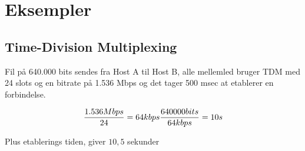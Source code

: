 \documentclass[10pt]{article}
\begin{document}
\section{Eksempler}

\subsection{Time-Division Multiplexing}
Fil på 640.000 bits sendes fra Host A til Host B, alle mellemled bruger TDM med
24 slots og en bitrate på 1.536 Mbps og det tager 500 msec at etablerer en
forbindelse.

\[
\frac{1.536 Mbps}{24} = 64 kbps \\
\frac{640000 bits}{64 kbps} = 10 s
\]

Plus etablerings tiden, giver $10,5$ sekunder
\end{document}
